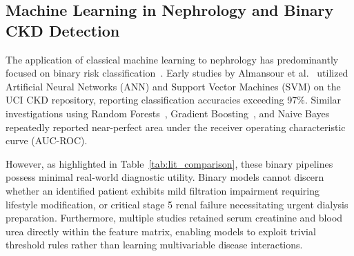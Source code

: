 \documentclass[conference]{IEEEtran}
\begin{document}
\subsection{Machine Learning in Nephrology and Binary CKD Detection}
The application of classical machine learning to nephrology has predominantly focused on binary risk classification~\cite{chittora2021efficient, boukenze2016predicting, misir2022performance}. Early studies by Almansour et al.~\cite{almansour2019neural} utilized Artificial Neural Networks (ANN) and Support Vector Machines (SVM) on the UCI CKD repository, reporting classification accuracies exceeding 97\%. Similar investigations using Random Forests~\cite{senan2021machine}, Gradient Boosting~\cite{debal2022comparative}, and Naive Bayes~\cite{rubini2015prediction} repeatedly reported near-perfect area under the receiver operating characteristic curve (AUC-ROC).

However, as highlighted in Table~\ref{tab:lit_comparison}, these binary pipelines possess minimal real-world diagnostic utility. Binary models cannot discern whether an identified patient exhibits mild filtration impairment requiring lifestyle modification, or critical stage 5 renal failure necessitating urgent dialysis preparation. Furthermore, multiple studies retained serum creatinine and blood urea directly within the feature matrix, enabling models to exploit trivial threshold rules rather than learning multivariable disease interactions.
\end{document}
